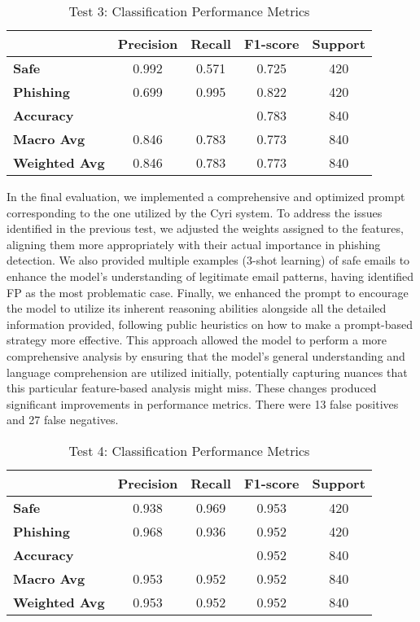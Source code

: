 \begin{table}[ht]
\centering
\caption{Test 3: Classification Performance Metrics}
\label{tab:test3}
\begin{tabular}{lcccc}
\toprule
& \textbf{Precision} & \textbf{Recall} & \textbf{F1-score} & \textbf{Support} \\
\midrule
\textbf{Safe}       & 0.992 & 0.571 & 0.725 & 420 \\
\textbf{Phishing}   & 0.699 & 0.995 & 0.822 & 420 \\
\midrule
\textbf{Accuracy}   & & & 0.783 & 840 \\
\textbf{Macro Avg}  & 0.846 & 0.783 & 0.773 & 840 \\
\textbf{Weighted Avg} & 0.846 & 0.783 & 0.773 & 840 \\
\bottomrule
\end{tabular}
\end{table}

In the final evaluation, we implemented a comprehensive and optimized prompt corresponding to the one utilized by the Cyri system. 
To address the issues identified in the previous test, we adjusted the weights assigned to the features, aligning them more appropriately with their actual importance in phishing detection. We also provided multiple examples (3-shot learning) of safe emails to enhance the model's understanding of legitimate email patterns, having identified FP as the most problematic case. Finally, we enhanced the prompt to encourage the model to utilize its inherent reasoning abilities alongside all the detailed information provided, following public heuristics on how to make a prompt-based strategy more effective. This approach allowed the model to perform a more comprehensive analysis by ensuring that the model’s general understanding and language comprehension are utilized initially, potentially capturing nuances that this particular feature-based analysis might miss. 
These changes produced significant improvements in performance metrics. There were 13 false positives and 27 false negatives.

\begin{table}[ht]
\centering
\caption{Test 4: Classification Performance Metrics}
\label{tab:updated-classification-metrics}
\begin{tabular}{lcccc}
\toprule
& \textbf{Precision} & \textbf{Recall} & \textbf{F1-score} & \textbf{Support} \\
\midrule
\textbf{Safe}       & 0.938 & 0.969 & 0.953 & 420 \\
\textbf{Phishing}   & 0.968 & 0.936 & 0.952 & 420 \\
\midrule
\textbf{Accuracy}   & & & 0.952 & 840 \\
\textbf{Macro Avg}  & 0.953 & 0.952 & 0.952 & 840 \\
\textbf{Weighted Avg} & 0.953 & 0.952 & 0.952 & 840 \\
\bottomrule
\end{tabular}
\end{table} 

